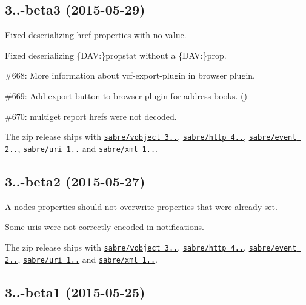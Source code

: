 \subsection*{3..-\/beta3 (2015-\/05-\/29) }


\begin{DoxyItemize}
\item Fixed deserializing href properties with no value.
\item Fixed deserializing {\ttfamily \{D\+AV\+:\}propstat} without a {\ttfamily \{D\+AV\+:\}prop}.
\item \#668\+: More information about vcf-\/export-\/plugin in browser plugin.
\item \#669\+: Add export button to browser plugin for address books. ()
\item \#670\+: multiget report hrefs were not decoded.
\item The zip release ships with \href{http://sabre.io/vobject/}{\tt sabre/vobject 3..}, \href{http://sabre.io/http/}{\tt sabre/http 4..}, \href{http://sabre.io/event/}{\tt sabre/event 2..}, \href{http://sabre.io/uri/}{\tt sabre/uri 1..} and \href{http://sabre.io/xml/}{\tt sabre/xml 1..}.
\end{DoxyItemize}

\subsection*{3..-\/beta2 (2015-\/05-\/27) }


\begin{DoxyItemize}
\item A node\textquotesingle{}s properties should not overwrite properties that were already set.
\item Some uris were not correctly encoded in notifications.
\item The zip release ships with \href{http://sabre.io/vobject/}{\tt sabre/vobject 3..}, \href{http://sabre.io/http/}{\tt sabre/http 4..}, \href{http://sabre.io/event/}{\tt sabre/event 2..}, \href{http://sabre.io/uri/}{\tt sabre/uri 1..} and \href{http://sabre.io/xml/}{\tt sabre/xml 1..}.
\end{DoxyItemize}

\subsection*{3..-\/beta1 (2015-\/05-\/25) }


